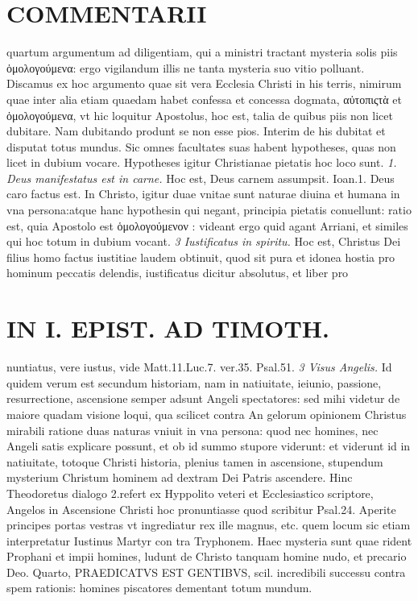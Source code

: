 \documentclass{article}
\begin{document}
\begin{pages}
\section*{COMMENTARII }
\marginpar{[ p.80 ]}\pstart quartum argumentum ad diligentiam, qui a ministri tractant mysteria solis piis ὁμολογούμενα: ergo vigilandum illis ne tanta mysteria suo vitio polluant. Discamus ex hoc argumento quae sit vera Ecclesia Christi in his terris, nimirum quae inter alia etiam quaedam habet confessa et concessa dogmata, αὐτοπιςτὰ et ὁμολογούμενα, vt hic loquitur Apostolus, hoc est, talia de quibus piis non licet dubitare. Nam dubitando produnt se non esse pios. Interim de his dubitat et disputat totus mundus. Sic omnes facultates suas habent hypotheses, quas non licet in dubium vocare. Hypotheses igitur Christianae pietatis hoc loco sunt.  \pend
\textit{1. Deus manifestatus est in carne. }\pstart Hoc est, Deus carnem assumpsit. Ioan.1. Deus caro factus est. In Christo, igitur duae vnitae sunt naturae diuina et humana in vna persona:atque hanc hypothesin qui negant, principia pietatis conuellunt: ratio est, quia Apostolo est ὁμολογούμενον : videant ergo quid agant Arriani, et similes qui hoc totum in dubium vocant.  \pend
\textit{3 Iustificatus in spiritu. }\pstart Hoc est, Christus Dei filius homo factus iustitiae laudem obtinuit, quod sit pura et idonea hostia pro hominum peccatis delendis, iustificatus dicitur absolutus, et liber pro\pend
\section*{IN I. EPIST. AD TIMOTH. }
\marginpar{[ p.81 ]}\pstart nuntiatus, vere iustus, vide Matt.11.Luc.7. ver.35. Psal.51.  \pend
\textit{3 Visus Angelis. }\pstart Id quidem verum est secundum historiam, nam in natiuitate, ieiunio, passione, resurrectione, ascensione semper adsunt Angeli spectatores: sed mihi videtur de maiore quadam visione loqui, qua scilicet contra An gelorum opinionem Christus mirabili ratione duas naturas vniuit in vna persona: quod nec homines, nec Angeli satis explicare possunt, et ob id summo stupore viderunt: et viderunt id in natiuitate, totoque Christi historia, plenius tamen in ascensione, stupendum mysterium Christum hominem ad dextram Dei Patris ascendere. Hinc Theodoretus dialogo 2.refert ex Hyppolito veteri et Ecclesiastico scriptore, Angelos in Ascensione Christi hoc pronuntiasse quod scribitur Psal.24. Aperite principes portas vestras vt ingrediatur rex ille magnus, etc. quem locum sic etiam interpretatur Iustinus Martyr con tra Tryphonem. Haec mysteria sunt quae rident Prophani et impii homines, ludunt de Christo tanquam homine nudo, et precario Deo.  \pend\pstart Quarto, PRAEDICATVS EST GENTIBVS, scil. incredibili successu contra spem rationis: homines piscatores dementant totum mundum.  \pend

\end{pages}
\end{document}
